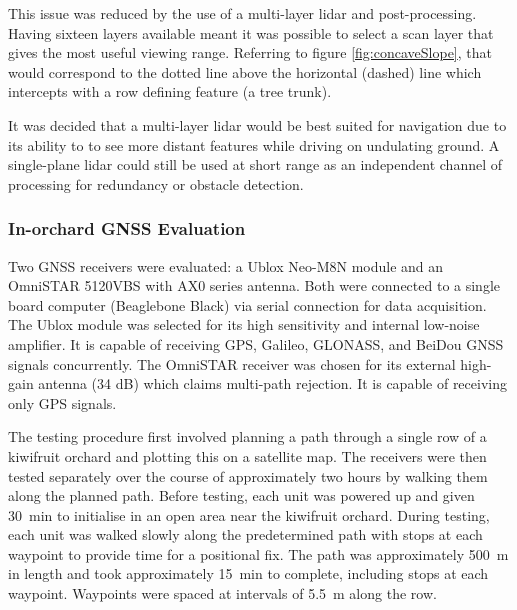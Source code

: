 \documentclass[preprint,authoryear,12pt]{elsarticle}
\begin{document}
        This issue was reduced by the use of a multi-layer lidar and post-processing.
        Having sixteen layers available meant it was possible to select a scan layer that gives the most useful viewing range.
        Referring to figure \ref{fig:concaveSlope}, that would correspond to the dotted line above the horizontal (dashed) line which intercepts with a row defining feature (a tree trunk).

        It was decided that a multi-layer lidar would be best suited for navigation due to its ability to to see more distant features while driving on undulating ground.
        A single-plane lidar could still be used at short range as an independent channel of processing for redundancy or obstacle detection.

    \subsubsection{In-orchard GNSS Evaluation}
        Two GNSS receivers were evaluated: a Ublox Neo-M8N module and an OmniSTAR 5120VBS with AX0 series antenna.
    	Both were connected to a single board computer (Beaglebone Black) via serial connection for data acquisition.
        The Ublox module was selected for its high sensitivity and internal low-noise amplifier.
        It is capable of receiving GPS, Galileo, GLONASS, and BeiDou GNSS signals concurrently.
        The OmniSTAR receiver was chosen for its external high-gain antenna (34 dB) which claims multi-path rejection.
        It is capable of receiving only GPS signals.

        The testing procedure first involved planning a path through a single row of a kiwifruit orchard and plotting this on a satellite map.
        The receivers were then tested separately over the course of approximately two hours by walking them along the planned path.
        Before testing, each unit was powered up and given \SI{30}{\minute} to initialise in an open area near the kiwifruit orchard.
        During testing, each unit was walked slowly along the predetermined path with stops at each waypoint to provide time for a positional fix.
        The path was approximately \SI{500}{\meter} in length and took approximately \SI{15}{\minute} to complete, including stops at each waypoint.
        Waypoints were spaced at intervals of \SI{5.5}{\meter} along the row.
\end{document}
